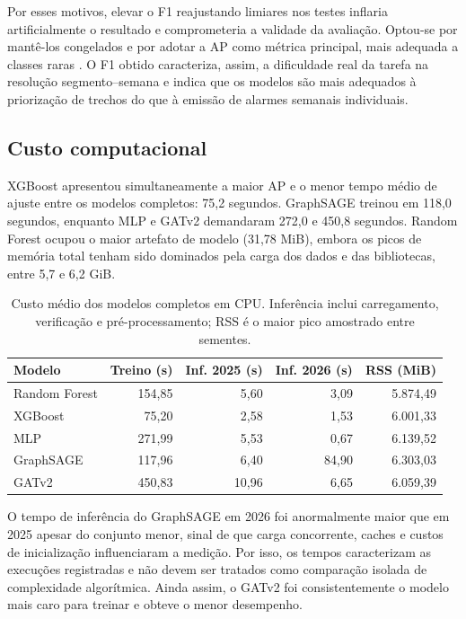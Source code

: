 \documentclass[12pt]{article}
\begin{document}
Por esses motivos, elevar o F1 reajustando limiares nos testes
inflaria artificialmente o resultado e comprometeria a validade da
avaliação. Optou-se por mantê-los congelados e por adotar a AP como
métrica principal, mais adequada a classes raras \cite{saito2015}. O F1
obtido caracteriza, assim, a dificuldade real da tarefa na resolução
segmento--semana e indica que os modelos são mais adequados à
priorização de trechos do que à emissão de alarmes semanais
individuais.

\subsection{Custo computacional}

XGBoost apresentou simultaneamente a maior AP e o menor tempo médio de
ajuste entre os modelos completos: 75,2 segundos. GraphSAGE treinou em
118,0 segundos, enquanto MLP e GATv2 demandaram 272,0 e 450,8 segundos.
Random Forest ocupou o maior artefato de modelo (31,78 MiB), embora os
picos de memória total tenham sido dominados pela carga dos dados e das
bibliotecas, entre 5,7 e 6,2 GiB.

\begin{table}[htbp]
\centering
\caption{Custo médio dos modelos completos em CPU. Inferência inclui
carregamento, verificação e pré-processamento; RSS é o maior pico
amostrado entre sementes.}
\label{tab:custos}
\footnotesize
\setlength{\tabcolsep}{4pt}
\begin{tabular}{lrrrr}
\toprule
\textbf{Modelo} & \textbf{Treino (s)} & \textbf{Inf. 2025 (s)} &
\textbf{Inf. 2026 (s)} & \textbf{RSS (MiB)} \\
\midrule
Random Forest & 154,85 & 5,60 & 3,09 & 5.874,49 \\
XGBoost & 75,20 & 2,58 & 1,53 & 6.001,33 \\
MLP & 271,99 & 5,53 & 0,67 & 6.139,52 \\
GraphSAGE & 117,96 & 6,40 & 84,90 & 6.303,03 \\
GATv2 & 450,83 & 10,96 & 6,65 & 6.059,39 \\
\bottomrule
\end{tabular}
\end{table}

O tempo de inferência do GraphSAGE em 2026 foi anormalmente maior que
em 2025 apesar do conjunto menor, sinal de que carga concorrente,
caches e custos de inicialização influenciaram a medição. Por isso, os
tempos caracterizam as execuções registradas e não devem ser tratados
como comparação isolada de complexidade algorítmica. Ainda assim, o
GATv2 foi consistentemente o modelo mais caro para treinar e obteve o
menor desempenho.
\end{document}
